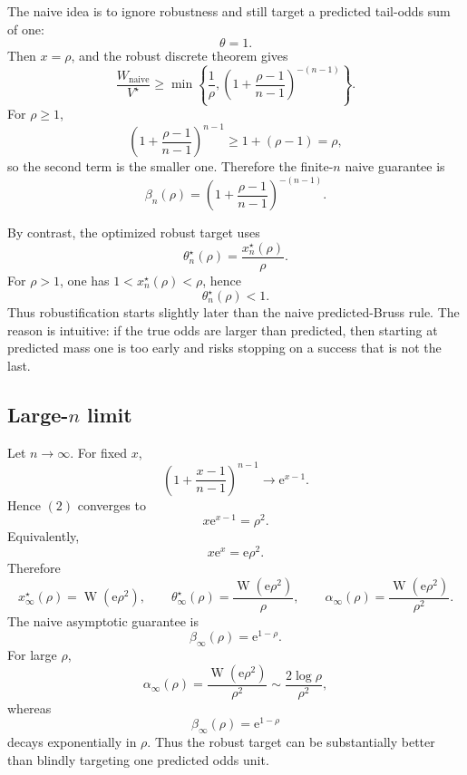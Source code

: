 \documentclass[11pt,a4paper]{article}
\DeclareMathOperator{\LambertW}{W}
\newcommand{\e}{\mathrm e}
\begin{document}
The naive idea is to ignore robustness and still target a predicted tail-odds
sum of one:
\[
  \theta=1.
\]
Then \(x=\rho\), and the robust discrete theorem gives
\[
  \frac{W_{\mathrm{naive}}}{V^\star}
  \ge
  \min\left\{\frac1\rho,
  \left(1+\frac{\rho-1}{n-1}\right)^{-(n-1)}\right\}.
\]
For \(\rho\ge1\),
\[
  \left(1+\frac{\rho-1}{n-1}\right)^{n-1}\ge 1+(\rho-1)=\rho,
\]
so the second term is the smaller one.  Therefore the finite-\(n\) naive
guarantee is
\[
  \boxed{
  \beta_n(\rho)
  =
  \left(1+\frac{\rho-1}{n-1}\right)^{-(n-1)}.
  }
  \tag{5}
\]

By contrast, the optimized robust target uses
\[
  \theta_n^\star(\rho)=\frac{x_n^\star(\rho)}{\rho}.
\]
For \(\rho>1\), one has \(1<x_n^\star(\rho)<\rho\), hence
\[
  \theta_n^\star(\rho)<1.
\]
Thus robustification starts slightly later than the naive predicted-Bruss rule.
The reason is intuitive: if the true odds are larger than predicted, then
starting at predicted mass one is too early and risks stopping on a success that
is not the last.

\subsection{Large-\(n\) limit}

Let \(n\to\infty\).  For fixed \(x\),
\[
  \left(1+\frac{x-1}{n-1}\right)^{n-1}\to \e^{x-1}.
\]
Hence \((2)\) converges to
\[
  x\e^{x-1}=\rho^2.
\]
Equivalently,
\[
  x\e^x=\e\rho^2.
\]
Therefore
\[
  \boxed{
  x_\infty^\star(\rho)=\LambertW(\e\rho^2),
  \qquad
  \theta_\infty^\star(\rho)=\frac{\LambertW(\e\rho^2)}{\rho},
  \qquad
  \alpha_\infty(\rho)=\frac{\LambertW(\e\rho^2)}{\rho^2}.
  }
  \tag{6}
\]
The naive asymptotic guarantee is
\[
  \boxed{
  \beta_\infty(\rho)=\e^{1-\rho}.
  }
  \tag{7}
\]
For large \(\rho\),
\[
  \alpha_\infty(\rho)
  =\frac{\LambertW(\e\rho^2)}{\rho^2}
  \sim
  \frac{2\log\rho}{\rho^2},
\]
whereas
\[
  \beta_\infty(\rho)=\e^{1-\rho}
\]
decays exponentially in \(\rho\).  Thus the robust target can be substantially
better than blindly targeting one predicted odds unit.
\end{document}
